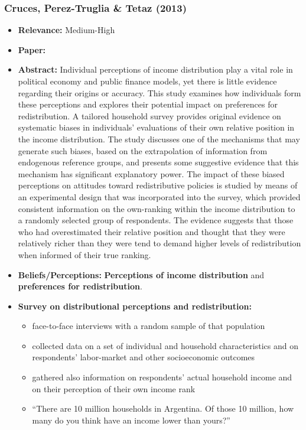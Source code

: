 \documentclass[a4paper, 12pt]{article}
\begin{document}
\subsubsection*{Cruces, Perez-Truglia \& Tetaz (2013)}
\begin{itemize}
    \item \textbf{Relevance:} Medium-High
    \item \textbf{Paper:} 
    \item \textbf{Abstract:} Individual perceptions of income distribution play a vital role in political economy and public finance models, yet there is little evidence regarding their origins or accuracy. This study examines how individuals form these perceptions and explores their potential impact on preferences for redistribution. A tailored household survey provides original evidence on systematic biases in individuals' evaluations of their own relative position in the income distribution. The study discusses one of the mechanisms that may generate such biases, based on the extrapolation of information from endogenous reference groups, and presents some suggestive evidence that this mechanism has significant explanatory power. The impact of these biased perceptions on attitudes toward redistributive policies is studied by means of an experimental design that was incorporated into the survey, which provided consistent information on the own-ranking within the income distribution to a randomly selected group of respondents. The evidence suggests that those who had overestimated their relative position and thought that they were relatively richer than they were tend to demand higher levels of redistribution when informed of their true ranking.
    \item \textbf{Beliefs/Perceptions:} \textbf{Perceptions of income distribution} and \textbf{preferences for redistribution}.
    \item \textbf{Survey on distributional perceptions and redistribution:} 
    \begin{itemize}
        \item face-to-face interviews with a random sample of that population
        \item collected data on a set of individual and household characteristics and on respondents' labor-market and other socioeconomic outcomes
        \item gathered also information on respondents' actual household income and on their perception of their own income rank
        \item “There are 10 million households in Argentina. Of those 10 million, how many do you think have an income lower than yours?”

\end{itemize}
\end{itemize}
\end{document}
